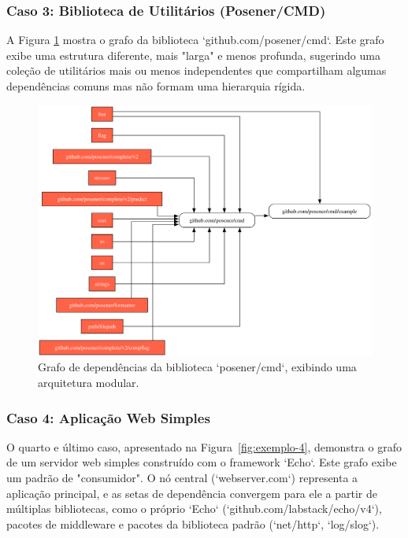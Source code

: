 \documentclass[12pt]{article}
\begin{document}
\subsubsection{Caso 3: Biblioteca de Utilitários (Posener/CMD)}
A Figura \ref{fig:exemplo-3} mostra o grafo da biblioteca `github.com/posener/cmd`. Este grafo exibe uma estrutura diferente, mais "larga" e menos profunda, sugerindo uma coleção de utilitários mais ou menos independentes que compartilham algumas dependências comuns mas não formam uma hierarquia rígida.

\begin{figure}[htbp]
\centering
\includegraphics[width=1\textwidth]{examples/github.com_posener_cmd.png}
\caption{Grafo de dependências da biblioteca `posener/cmd`, exibindo uma arquitetura modular.}
\label{fig:exemplo-3}
\end{figure}

\subsubsection{Caso 4: Aplicação Web Simples}
O quarto e último caso, apresentado na Figura~\ref{fig:exemplo-4}, demonstra o grafo de um servidor web simples construído com o framework `Echo`. Este grafo exibe um padrão de "consumidor". O nó central (`webserver.com`) representa a aplicação principal, e as setas de dependência convergem para ele a partir de múltiplas bibliotecas, como o próprio `Echo` (`github.com/labstack/echo/v4`), pacotes de middleware e pacotes da biblioteca padrão (`net/http`, `log/slog`).
\end{document}
